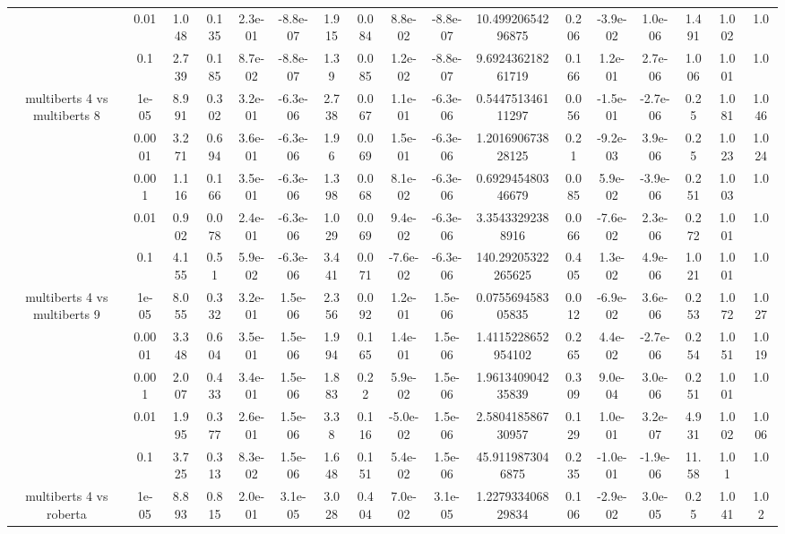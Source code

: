 \begin{tabular}{|c|c|c|c|c|c|c|c|c|c|c|c|c|c|c|c|c|}
 & 0.01 & 1.048 & 0.135 & 2.3e-01 & -8.8e-07 & 1.915 & 0.084 & 8.8e-02 & -8.8e-07 & 10.49920654296875 & 0.206 & -3.9e-02 & 1.0e-06 & 1.491 & 1.002 & 1.0 \\
 & 0.1 & 2.739 & 0.185 & 8.7e-02 & -8.8e-07 & 1.39 & 0.085 & 1.2e-02 & -8.8e-07 & 9.692436218261719 & 0.166 & 1.2e-01 & 2.7e-06 & 1.006 & 1.001 & 1.0 \\
\hline
\multirow{5}{*}{multiberts 4 vs multiberts 8} & 1e-05 & 8.991 & 0.302 & 3.2e-01 & -6.3e-06 & 2.738 & 0.067 & 1.1e-01 & -6.3e-06 & 0.544751346111297 & 0.056 & -1.5e-01 & -2.7e-06 & 0.25 & 1.081 & 1.046 \\
 & 0.0001 & 3.271 & 0.694 & 3.6e-01 & -6.3e-06 & 1.96 & 0.069 & 1.5e-01 & -6.3e-06 & 1.201690673828125 & 0.21 & -9.2e-03 & 3.9e-06 & 0.25 & 1.023 & 1.024 \\
 & 0.001 & 1.116 & 0.166 & 3.5e-01 & -6.3e-06 & 1.398 & 0.068 & 8.1e-02 & -6.3e-06 & 0.692945480346679 & 0.085 & 5.9e-02 & -3.9e-06 & 0.251 & 1.003 & 1.0 \\
 & 0.01 & 0.902 & 0.078 & 2.4e-01 & -6.3e-06 & 1.029 & 0.069 & 9.4e-02 & -6.3e-06 & 3.35433292388916 & 0.066 & -7.6e-02 & 2.3e-06 & 0.272 & 1.001 & 1.0 \\
 & 0.1 & 4.155 & 0.51 & 5.9e-02 & -6.3e-06 & 3.441 & 0.071 & -7.6e-02 & -6.3e-06 & 140.29205322265625 & 0.405 & 1.3e-02 & 4.9e-06 & 1.021 & 1.001 & 1.0 \\
\hline
\multirow{5}{*}{multiberts 4 vs multiberts 9} & 1e-05 & 8.055 & 0.332 & 3.2e-01 & 1.5e-06 & 2.356 & 0.092 & 1.2e-01 & 1.5e-06 & 0.075569458305835 & 0.012 & -6.9e-02 & 3.6e-06 & 0.253 & 1.072 & 1.027 \\
 & 0.0001 & 3.348 & 0.604 & 3.5e-01 & 1.5e-06 & 1.994 & 0.165 & 1.4e-01 & 1.5e-06 & 1.4115228652954102 & 0.265 & 4.4e-02 & -2.7e-06 & 0.254 & 1.051 & 1.019 \\
 & 0.001 & 2.007 & 0.433 & 3.4e-01 & 1.5e-06 & 1.883 & 0.22 & 5.9e-02 & 1.5e-06 & 1.961340904235839 & 0.309 & 9.0e-04 & 3.0e-06 & 0.251 & 1.001 & 1.0 \\
 & 0.01 & 1.995 & 0.377 & 2.6e-01 & 1.5e-06 & 3.38 & 0.116 & -5.0e-02 & 1.5e-06 & 2.580418586730957 & 0.129 & 1.0e-01 & 3.2e-07 & 4.931 & 1.002 & 1.006 \\
 & 0.1 & 3.725 & 0.313 & 8.3e-02 & 1.5e-06 & 1.648 & 0.151 & 5.4e-02 & 1.5e-06 & 45.9119873046875 & 0.235 & -1.0e-01 & -1.9e-06 & 11.58 & 1.01 & 1.0 \\
\hline
\multirow{5}{*}{multiberts 4 vs roberta } & 1e-05 & 8.893 & 0.815 & 2.0e-01 & 3.1e-05 & 3.028 & 0.404 & 7.0e-02 & 3.1e-05 & 1.227933406829834 & 0.106 & -2.9e-02 & 3.0e-05 & 0.25 & 1.041 & 1.02 \\

\end{tabular}
